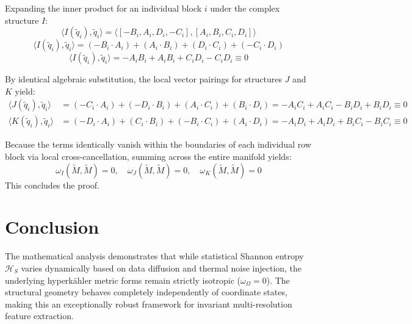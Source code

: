 \documentclass[11pt,preview,cite,epsf,twoside,amsfonts]{amsart}
\begin{document}
Expanding the inner product for an individual block $i$ under the complex structure $I$:
\begin{equation}
\langle I(\tilde{q}_i), \tilde{q}_i \rangle = \langle [-B_i, A_i, D_i, -C_i], [A_i, B_i, C_i, D_i] \rangle
\end{equation}
\begin{equation}
\langle I(\tilde{q}_i), \tilde{q}_i \rangle = (-B_i \cdot A_i) + (A_i \cdot B_i) + (D_i \cdot C_i) + (-C_i \cdot D_i)
\end{equation}
\begin{equation}
\langle I(\tilde{q}_i), \tilde{q}_i \rangle = -A_i B_i + A_i B_i + C_i D_i - C_i D_i \equiv 0
\end{equation}

By identical algebraic substitution, the local vector pairings for structures $J$ and $K$ yield:
\begin{align}
\langle J(\tilde{q}_i), \tilde{q}_i \rangle &= (-C_i \cdot A_i) + (-D_i \cdot B_i) + (A_i \cdot C_i) + (B_i \cdot D_i) = -A_i C_i + A_i C_i - B_i D_i + B_i D_i \equiv 0 \\
\langle K(\tilde{q}_i), \tilde{q}_i \rangle &= (-D_i \cdot A_i) + (C_i \cdot B_i) + (-B_i \cdot C_i) + (A_i \cdot D_i) = -A_i D_i + A_i D_i + B_i C_i - B_i C_i \equiv 0
\end{align}

Because the terms identically vanish within the boundaries of each individual row block via local cross-cancellation, summing across the entire manifold yields:
\begin{equation}
\omega_I(\tilde{M}, \tilde{M}) = 0, \quad \omega_J(\tilde{M}, \tilde{M}) = 0, \quad \omega_K(\tilde{M}, \tilde{M}) = 0
\end{equation}
This concludes the proof.

\section{Conclusion}
The mathematical analysis demonstrates that while statistical Shannon entropy $\mathcal{H}_S$ varies dynamically based on data diffusion and thermal noise injection, the underlying hyperk\"{a}hler metric forms remain strictly isotropic ($\omega_\Omega = 0$). The structural geometry behaves completely independently of coordinate states, making this an exceptionally robust framework for invariant multi-resolution feature extraction.
\end{document}
